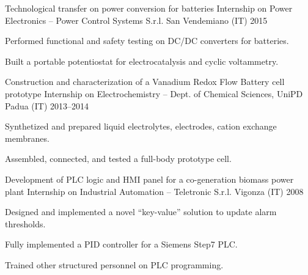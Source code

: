 \begin{cventries}
    \cventry%
        {Technological transfer on power conversion for batteries}
        {Internship on Power Electronics -- Power Control Systems S.r.l.}
        {San Vendemiano (IT)}
        {2015}
        {\begin{cvitems}
            \item Performed functional and safety testing on DC/DC converters for batteries.
            \item Built a portable potentiostat for electrocatalysis and cyclic voltammetry.
        \end{cvitems}}

    \cventry%
        {Construction and characterization of a Vanadium Redox Flow Battery cell prototype}
        {Internship on Electrochemistry -- Dept. of Chemical Sciences, UniPD}
        {Padua (IT)}
        {2013--2014}
        {\begin{cvitems}
            \item Synthetized and prepared liquid electrolytes, electrodes, cation exchange membranes.
            \item Assembled, connected, and tested a full-body prototype cell.
        \end{cvitems}}

    \cventry%
        {Development of PLC logic and HMI panel for a co-generation biomass power plant}
        {Internship on Industrial Automation -- Teletronic S.r.l.}
        {Vigonza (IT)}
        {2008}
        {\begin{cvitems}
            \item Designed and implemented a novel ``key-value'' solution to update alarm thresholds.
            \item Fully implemented a PID controller for a Siemens Step7 PLC.
            \item Trained other structured personnel on PLC programming.
        \end{cvitems}}

\end{cventries}
